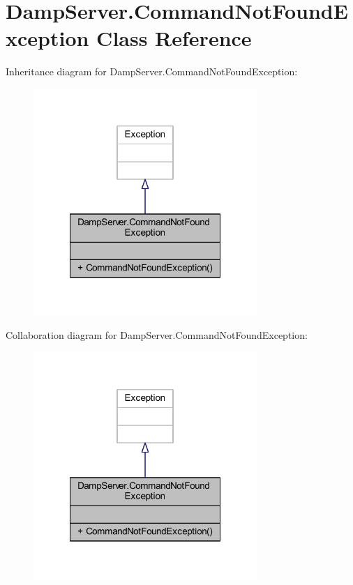 \hypertarget{class_damp_server_1_1_command_not_found_exception}{\section{Damp\-Server.\-Command\-Not\-Found\-Exception Class Reference}
\label{class_damp_server_1_1_command_not_found_exception}
}


Inheritance diagram for Damp\-Server.\-Command\-Not\-Found\-Exception\-:\nopagebreak
\begin{figure}[H]
\begin{center}
\leavevmode
\includegraphics[width=240pt]{class_damp_server_1_1_command_not_found_exception__inherit__graph}
\end{center}
\end{figure}


Collaboration diagram for Damp\-Server.\-Command\-Not\-Found\-Exception\-:\nopagebreak
\begin{figure}[H]
\begin{center}
\leavevmode
\includegraphics[width=240pt]{class_damp_server_1_1_command_not_found_exception__coll__graph}
\end{center}
\end{figure}
